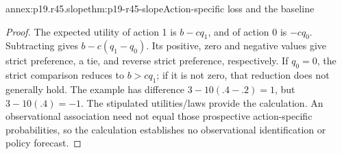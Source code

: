 \begin{annexitem}{annex:p19.r45.slope}{thm:p19-r45-slope}{Action-specific loss and the baseline}
\begin{proof}
The expected utility of action 1 is \(b-cq_1\), and of action 0
is \(-cq_0\). Subtracting gives \(b-c(q_1-q_0)\).
Its positive, zero and negative values give strict preference, a tie,
and reverse strict preference, respectively. If \(q_0=0\), the
strict comparison reduces to \(b>cq_1\); if it is not zero, that
reduction does not generally hold. The example has difference
\(3-10(.4-.2)=1\), but \(3-10(.4)=-1\).
The stipulated utilities/laws provide the calculation. An observational
association need not equal those prospective action-specific
probabilities, so the calculation establishes no observational
identification or policy forecast.
\end{proof}
\end{annexitem}
